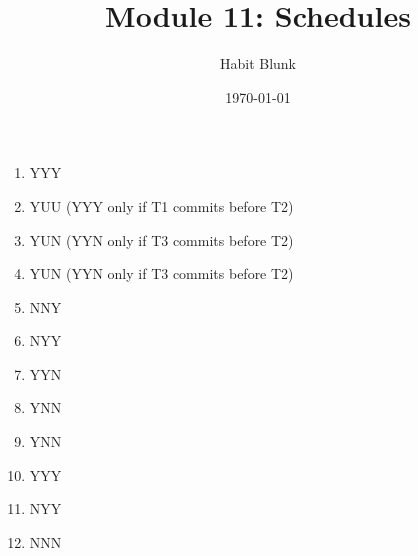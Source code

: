 \documentclass[fleqn]{article}
\title{Module 11: Schedules}
\author{Habit Blunk}
\date{\today}
\begin{document}
\maketitle

\begin{enumerate}
  \item YYY
  \item YUU (YYY only if T1 commits before T2)
  \item YUN (YYN only if T3 commits before T2)
  \item YUN (YYN only if T3 commits before T2)
  \item NNY
  \item NYY
  \item YYN
  \item YNN
  \item YNN
  \item YYY
  \item NYY
  \item NNN
\end{enumerate}
\end{document}
